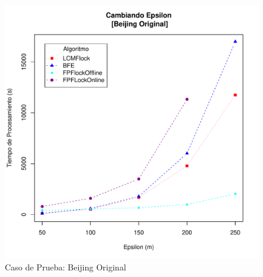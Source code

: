 \begin{figure}
  \centering
  \includegraphics[scale=0.55]{pictures/Beijing_Original.pdf}
  \caption{Caso de Prueba: Beijing Original}
  \label{fig:BeijingOr}
\end{figure}

